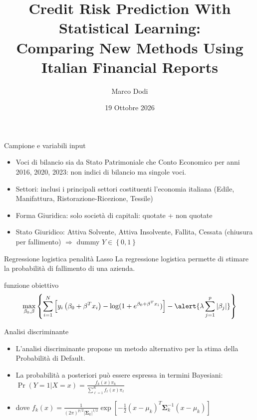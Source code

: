 \documentclass[12pt, aspectratio=169, handout]{beamer}
\title{\large Credit Risk Prediction With Statistical Learning:\\
	\large Comparing New Methods Using Italian Financial Reports}
\author{Marco Dodi}
\date{19 Ottobre 2026}
\institute{\normalsize Università degli Studi di Parma}
\begin{document}
	\maketitle
	
	\begin{frame}{Campione e variabili input}
		\begin{itemize}
			\item<+-> Voci di bilancio sia da Stato Patrimoniale che Conto Economico per anni 2016, 2020, 2023: non indici di bilancio ma singole voci.
			\item<+-> Settori: inclusi i principali settori costituenti l'economia italiana (Edile, Manifattura, Ristorazione-Ricezione, Tessile)
			\item<+-> Forma Giuridica: solo società di capitali: quotate + non quotate
			\item<+-> \alert{Stato Giuridico}: Attiva Solvente, Attiva Insolvente, Fallita, Cessata (chiusura per fallimento) $\Rightarrow$ dummy $Y \in \left\{0, 1\right\}$
		\end{itemize}
	\end{frame}
	
	\begin{frame}{Regressione logistica penalità Lasso}
		La regressione logistica permette di stimare la probabilità di fallimento di una azienda. 
		\begin{block}{funzione obiettivo}
			$$\max_{\beta_{0}, \beta} \left\{\sum_{i = 1}^{N} \left[y_{i} \left(\beta_{0} + \beta^T x_{i}\right) - \log(1 + e^{\beta_{0} + \beta^T x_{i}})\right] - \alert{\lambda \sum_{j = 1}^{p} |\beta_{j}|}\right\}$$
		\end{block}
	\end{frame}
	
	\begin{frame}{Analisi discriminante}
		\begin{itemize}
			\item<+-> L'analisi discriminante propone un metodo alternativo per la stima della Probabilità di Default.
			\item<+-> La probabilità a posteriori può essere espressa in termini Bayesiani: $\Pr(Y = 1|X = x) = \frac{f_{k}(x) \pi_{k}}{\sum_{\ell = 1}^{K} f_{\ell}(x) \pi_{\ell}}$
			\item<+-> dove $f_k(x) = \frac{1}{(2\pi)^{p/2} |\boldsymbol{\Sigma}_{k}|^{1/2}} \exp\left[-\frac{1}{2} (x - \mu_{k})^T \boldsymbol{\Sigma}_{k}^{-1} (x - 	\mu_{k})\right]$
		\end{itemize}
	\end{frame}
	
\end{document}
